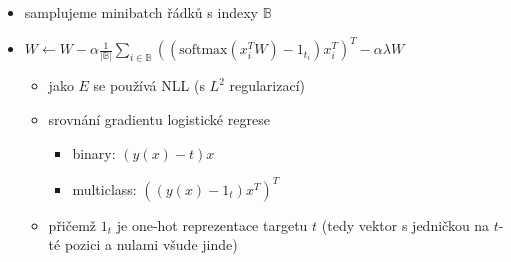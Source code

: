 \begin{itemize}
\begin{itemize}
\begin{itemize}
\begin{itemize}
\item samplujeme minibatch řádků s indexy $\mathbb B$
\item $W\leftarrow W-\alpha\frac1{|\mathbb B|}\sum_{i\in \mathbb B}\left((\text{softmax}(x_i^TW)-1_{t_i})x_i^T\right)^T-\alpha\lambda W$
\begin{itemize}
\item jako $E$ se používá NLL (s $L^2$ regularizací)
\item srovnání gradientu logistické regrese
\begin{itemize}
\item binary: $(y(x)-t)x$
\item multiclass: $((y(x)-1_t)x^T)^T$
\end{itemize}
\item přičemž $1_t$ je one-hot reprezentace targetu $t$ (tedy vektor s jedničkou na $t$-té pozici a nulami všude jinde)
\end{itemize}
\end{itemize}
\end{itemize}
\end{itemize}
\end{itemize}
